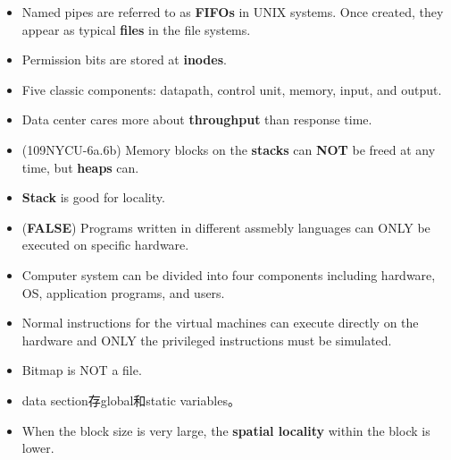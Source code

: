 \begin{itemize}
    \item Named pipes are referred to as \textbf{FIFOs} in UNIX systems. Once created, they appear as typical \textbf{files} in the file systems. 
    \item Permission bits are stored at \textbf{inodes}.
    \item Five classic components: datapath, control unit, memory, input, and output.
    \item Data center cares more about \textbf{throughput} than response time.
    \item (109NYCU-6a.6b) Memory blocks on the \textbf{stacks} can \textbf{NOT} be freed at any time, but \textbf{heaps} can.
    \item \textbf{Stack} is good for locality.
    \item (\textbf{FALSE}) Programs written in different assmebly languages can ONLY be executed on specific hardware.
    \item Computer system can be divided into four components including hardware, OS, application programs, and users.  
    \item Normal instructions for the virtual machines can execute directly on the hardware and ONLY the privileged instructions must be simulated.
    \item Bitmap is NOT a file.
    \item data section存global和static variables。
    \item When the block size is very large, the \textbf{spatial locality} within the block is lower.
\end{itemize}

\pagebreak
